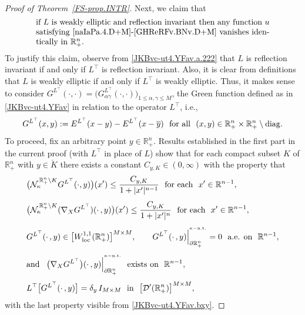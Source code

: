 \documentclass[11pt,reqno]{amsart}
\numberwithin{equation}{section}
\theoremstyle{remark}
\begin{document}
\begin{proof}[Proof of Theorem~\ref{FS-prop.INTR}]
Next, we claim that 
%
\begin{equation}\label{GHUNNDs.D+M}
\parbox{10.00cm}{if $L$ is weakly elliptic and reflection invariant then any function $u$ 
satisfying \eqref{naIaPa.4.D+M}-\eqref{GHReRFv.BNv.D+M} vanishes identically in ${\mathbb{R}}^n_{+}$.}
\end{equation}
%
To justify this claim, observe from \eqref{JKBvc-ut4.YFav.a.222} that $L$ is reflection invariant if and only if 
$L^\top$ is reflection invariant. Also, it is clear from definitions that $L$ is weakly elliptic if and only if 
$L^\top$ is weakly elliptic. Thus, it makes sense to consider 
$G^{L^\top}(\cdot,\cdot)=\big(G^{L^\top}_{\alpha\gamma}(\cdot,\cdot)\big)_{1\leq\alpha,\gamma\leq M}$, 
the Green function defined as in \eqref{JKBvc-ut4.YFav} in relation to the operator $L^\top$, i.e., 
%
\begin{equation}\label{JKBvc-ut4.YFav.bxy}
G^{L^\top}(x,y):=E^{L^\top}(x-y)-E^{L^\top}(x-\overline{y})
\,\,\text{ for all }\,\,(x,y)\in{\mathbb{R}}^n_{+}\times{\mathbb{R}}^n_{+}\setminus{\rm diag}.
\end{equation}
%
To proceed, fix an arbitrary point $y\in{\mathbb{R}}^n_{+}$. Results established in the first part in the current proof
(with $L^\top$ in place of $L$) show that for each compact subset $K$ of ${\mathbb{R}}^n_{+}$ with $y\in\mathring{K}$
there exists a constant $C_{y,K}\in(0,\infty)$ with the property that 
%
\begin{align}\label{GLa.1.i.D+M}
&\big(\mathcal{N}^{\,\mathbb{R}^{n}_{+}\setminus K}_\kappa G^{L^\top}(\cdot,y)\big)(x')\leq
\frac{C_{y,K}}{1+|x'|^{n-1}}\,\,\text{ for each }\,\,x'\in{\mathbb{R}}^{n-1},
\\[4pt]
&\big({\mathcal{N}}_\kappa^{\,\mathbb{R}^{n}_{+}\setminus K}(\nabla_X G^{L^\top})(\cdot\,,y)\big)(x')
\leq\frac{C_{y,K}}{1+|x'|^{n}}\,\,\text{ for each }\,\,x'\in{\mathbb{R}}^{n-1},
\label{GLa.1.ii.D+M}
\\[4pt]
& G^{L^\top}(\cdot\,,y)\in\big[W^{1,1}_{\rm loc}({\mathbb{R}}^n_{+})\big]^{M\times M},\qquad
G^{L^\top}(\cdot\,,y)\Big|_{\partial\mathbb{R}^{n}_{+}}^{{}^{\kappa-{\rm n.t.}}}=0
\,\,\text{ a.e. on }\,\,{\mathbb{R}}^{n-1},
\label{GLa.2.D+M}
\\[4pt]
&\text{and }\,\,\,\big(\nabla_X G^{L^\top}\big)(\cdot\,,y)\Big|_{\partial\mathbb{R}^{n}_{+}}^{{}^{\kappa-{\rm n.t.}}}
\,\,\text{ exists on }\,\,{\mathbb{R}}^{n-1},
\label{GLa.3.D+M}
\\[4pt]
& L^{\top}\big[G^{L^{\top}}(\cdot\,,y)\big]=\delta_{y}\,I_{M\times M}\,\,\text{ in }\,\,\big[{\mathcal{D}}'({\mathbb{R}}^n_{+})\big]^{M\times M},
\label{GHCewd-23.RRe.TTT}
\end{align}
%
with the last property visible from \eqref{JKBvc-ut4.YFav.bxy}. 


\end{proof}
\end{document}
